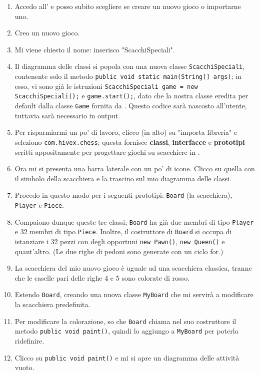 \begin{enumerate}
	\item Accedo all' e posso subito scegliere se creare un nuovo gioco o importarne uno.
	\item Creo un nuovo gioco.
	\item Mi viene chiesto il nome: inserisco "ScacchiSpeciali".
	\item Il diagramma delle classi si popola con una nuova classe \texttt{ScacchiSpeciali}, contenente solo il metodo \texttt{public void static main(String[] args)}; in esso, vi sono già le istruzioni \texttt{ScacchiSpeciali game = new ScacchiSpeciali();} e \texttt{game.start();}, dato che la nostra classe eredita per default dalla classe \texttt{Game} fornita da \proj. Questo codice sarà nascosto all'utente, tuttavia sarà necessario in output.
	\item Per risparmiarmi un po' di lavoro, clicco (in alto) su "importa libreria" e seleziono \texttt{com.hivex.chess}; questa fornisce \textbf{classi}, \textbf{interfacce} e \textbf{prototipi} scritti appositamente per progettare giochi su scacchiere in \proj.
	\item Ora mi si presenta una barra laterale con un po' di icone. Clicco su quella con il simbolo della scacchiera e la trascino sul mio diagramma delle classi.
	\item Procedo in questo modo per i seguenti prototipi: \texttt{Board} (la scacchiera), \texttt{Player} e \texttt{Piece}.
	\item Compaiono dunque queste tre classi; \texttt{Board} ha già due membri di tipo \texttt{Player} e 32 membri di tipo \texttt{Piece}. Inoltre, il costruttore di \texttt{Board} si occupa di istanziare i 32 pezzi con degli opportuni \texttt{new Pawn()}, \texttt{new Queen()} e quant'altro. (Le due righe di pedoni sono generate con un ciclo for.)
	\item La scacchiera del mio nuovo gioco è uguale ad una scacchiera classica, tranne che le caselle pari delle righe 4 e 5 sono colorate di rosso.
	\item Estendo \texttt{Board}, creando una nuova classe \texttt{MyBoard} che mi servirà a modificare la scacchiera predefinita.
	\item Per modificare la colorazione, so che \texttt{Board} chiama nel suo costruttore il metodo \texttt{public void paint()}, quindi lo aggiungo a \texttt{MyBoard} per poterlo ridefinire.
	\item Clicco su \texttt{public void paint()} e mi si apre un diagramma delle attività vuoto.

\end{enumerate}
